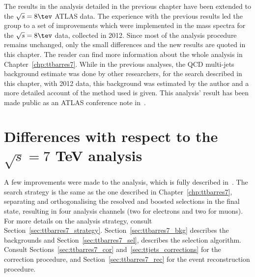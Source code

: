 
The results in the analysis detailed in the previous chapter have been extended to the $\sqrt{s} =8\tev$
ATLAS data. The experience with the previous results led the group to a set of improvements which were implemented
in the \ttbar mass spectra for the $\sqrt{s}= 8\tev$ data, collected in 2012.
Since most of the analysis procedure remains unchanged, only the small differences and the new results are quoted in this chapter. The reader can find
more information about the whole analysis in Chapter~\ref{chp:ttbarres7}.
While in the previous analyses, the QCD multi-jets background estimate was done by other researchers, for the search described in this chapter,
with 2012 data, this background was estimated by the author and a more detailed account of the method used is given.
This analysis' result has been made public as an ATLAS conference note in~\cite{ttres8note}.

\section{Differences with respect to the $\sqrt{s} = 7$ TeV analysis}

A few improvements were made to the analysis, which is fully described in~\cite{ttres8note}.
The search strategy is the same as the one described in Chapter~\ref{chp:ttbarres7}, separating and orthogonalising the resolved and boosted selections
in the final state, resulting in four analysis channels (two for electrons and two for muons). For more details on the analysis strategy, consult Section~\ref{sec:ttbarres7_strategy}.
Section~\ref{sec:ttbarres7_bkg} describes the backgrounds and Section~\ref{sec:ttbarres7_sel}, describes the selection algorithm. Consult Sections~\ref{sec:ttbarres7_cor} and~\ref{sec:ttjets_corrections} for the
correction procedure, and Section~\ref{sec:ttbarres7_rec} for the event reconstruction procedure.

